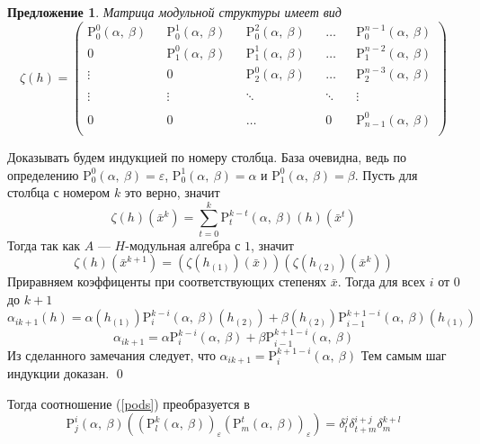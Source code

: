 \documentclass[12pt, reqno, a4paper, oneside, notitlepage]{amsart}
\makeatletter
\theoremstyle{mytheoremstyle}
\newtheorem{proposition}[theorem]{Предложение}
\theoremstyle{myremarkstyle}
\numberwithin{equation}{section}
\renewenvironment{proof}[1][\proofname]{\par\indent {\bfseries #1\@addpunct{.} }}{\qed}
\makeatother
\begin{document}
\begin{proposition}
  Матрица модульной структуры имеет вид 
  \begin{equation}
	\zeta(h) = 
	\begin{pmatrix}
	  \mathrm{P}^0_0(\alpha,\ \beta) && \mathrm{P}^1_0(\alpha,\ \beta) && \mathrm{P}^2_0(\alpha,\ \beta) && \dots  && \mathrm{P}^{n-1}_0(\alpha,\ \beta) \\
	  0 && \mathrm{P}^0_1(\alpha,\ \beta) && \mathrm{P}^1_1(\alpha,\ \beta) && \dots  && \mathrm{P}^{n-2}_1(\alpha,\ \beta) \\
	  \vdots && 0 && \mathrm{P}^0_2(\alpha,\ \beta) && \dots  && \mathrm{P}^{n-3}_2(\alpha,\ \beta)\\
	  \\
	  \vdots &&  \vdots && \ddots && \ddots && \vdots \\
	  \\
	  0 && 0 && \dots && 0 && \mathrm{P}^0_{n-1}(\alpha,\ \beta) \\ \label{matrixPol}
	\end{pmatrix}
  \end{equation}
\end{proposition}

\begin{proof}
  Доказывать будем индукцией по номеру столбца. 
  База очевидна, ведь по определению $\mathrm{P}^0_0(\alpha,\ \beta) = \varepsilon$, $\mathrm{P}^1_0(\alpha,\ \beta) = \alpha$ и $\mathrm{P}^0_1(\alpha,\ \beta) = \beta$.
  Пусть для столбца с номером $k$ это верно, значит
  \[
	\zeta(h)(\bar x^k) = \sum\limits_{t = 0}^k \mathrm{P}^{k-t}_t(\alpha,\ \beta)(h)(\bar x^t) 
  \]
  Тогда так как $A$ --- $H$-модульная алгебра с $1$, значит
  \[
	\zeta(h)(\bar x^{k+1}) = \left(\zeta(h_{(1)})(\bar x)\right) \left(\zeta(h_{(2)})(\bar x^k)\right)
  \]
  Приравняем коэффиценты при соответствующих степенях $\bar x$. Тогда для всех $i$ от $0$ до $k+1$ 
  \[
	\alpha_{ik+1}(h) = \alpha(h_{(1)})\mathrm{P}^{k-i}_i(\alpha,\ \beta)(h_{(2)})+\beta(h_{(2)})\mathrm{P}^{k+1-i}_{i-1}(\alpha,\ \beta)(h_{(1)})
  \]
  \[
	\alpha_{ik+1} = \alpha\mathrm{P}^{k-i}_i(\alpha,\ \beta)+\beta\mathrm{P}^{k+1-i}_{i-1}(\alpha,\ \beta)
  \]
  Из сделанного замечания следует, что $\alpha_{ik+1} = \mathrm{P}^{k+1-i}_{i}(\alpha,\ \beta)$
  Тем самым шаг индукции доказан.
\end{proof}

Тогда соотношение (\ref{pods}) преобразуется в 
\begin{equation} \label{pods*}
  \mathrm{P}^i_j(\alpha,\ \beta)\left(\left(\mathrm{P}^k_l(\alpha,\ \beta)\right)_\varepsilon\left(\mathrm{P}^t_m(\alpha,\ \beta)\right)_\varepsilon\right) = 
  \delta^j_l\delta^{i+j}_{t+m}\delta^{k+l}_m
\end{equation}
\end{document}
